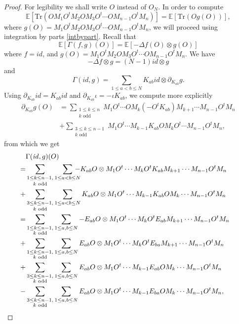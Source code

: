 \documentclass[11pt]{amsart}
\theoremstyle{definition}
\numberwithin{theorem}{section}
\newcommand{\id}{\mathit{id}}
\newcommand{\Tr}{\mathrm{Tr}}
\begin{document}
\begin{proof}
For legibility we shall write $O$ instead of $O_N$. In order
to compute
$$\mathbb{E}\left[\Tr(O M_1 O^t M_2 O M_3 O^t \cdots O M_{n-1}O ^t M_n)\right]=\mathbb{E}\left[\Tr(O g(O))\right],$$
where $g(O)=M_1 O^t M_2 O M_3 O^t \cdots O M_{n-1} O^t M_n$,
we will proceed using integration by parts \eqref{intbypart}. Recall that
\begin{equation*}
\mathbb{E}[\Gamma(f,g)(O)]=\mathbb{E}[-\Delta f(O)\otimes g(O)]
\end{equation*}
where $f=id$, and $g(O)=M_1O^tM_2OM_3O^t\cdots OM_{n-1}O^t M_n$. We have
$$-\Delta f \otimes g=(N-1)id\otimes g$$
and
\[
\Gamma(id,g)=\sum_{1\leq a< b\leq N}K_{ab}id\otimes
\partial_{K_{ab}}g.
\]
Using $\partial_{K_{ab}}id=K_{ab}id$ and
$\partial_{K_{ab}}\iota=-\iota K_{ab}$, we compute more
explicitly
\begin{align*}
\partial_{K_{ab}}g(O)&=\sum_{\substack{1\leq k \leq n\\k\text{ odd}}}M_1O^t\cdots OM_{k}(-O^tK_{ab})M_{k+1}\cdots M_{n-1}O^t M_n\\
&+\sum_{\substack{3\leq k \leq n-1\\k\text{ odd}}}M_1O^t\cdots M_{k-1}K_{ab}OM_{k}O^t\cdots M_{n-1}O^t M_n,
\end{align*}
from which we get
\begin{align*} \lefteqn{
\Gamma(\id,   g)(O) } \\
 = &
\mathop{\sum_{1 \leq k \leq n-1,}}_{k \text{ odd} }
\sum_{1 \leq a < b \leq N} \kern-1em 
-K_{ab}O \otimes M_1O^t \cdots M_{k}O^tK_{ab}M_{k+1} \cdots M_{n-1}O^t M_n \\
+ & 
\mathop{\sum_{3 \leq k \leq n-1,}}_{k \text{ odd} }
\sum_{1\leq a< b\leq N} 
K_{ab}O\otimes M_1O^t\cdots M_{k-1}K_{ab}OM_{k}\cdots M_{n-1}O^t M_n\\
=&\sum_{\substack{1\leq k \leq n-1,\\k\text{ odd}}}\sum_{1\leq a, b\leq N}-E_{ab}O\otimes M_1O^t\cdots M_{k}O^tE_{ab}M_{k+1}\cdots M_{n-1}O^t M_n\\
+&\sum_{\substack{1\leq k \leq n-1,\\k\text{ odd}}}\sum_{1\leq a, b\leq N}E_{ab}O\otimes M_1O^t\cdots M_{k}O^tE_{ba}M_{k+1}\cdots M_{n-1}O^t M_n\\
+&\sum_{\substack{3\leq k \leq n-1,\\k\text{ odd}}}\sum_{1\leq a, b\leq N} E_{ab}O\otimes M_1O^t\cdots M_{k-1}E_{ab}OM_{k}\cdots M_{n-1}O^t M_n\\
-&\sum_{\substack{3\leq k \leq n-1,\\k\text{ odd}}}\sum_{1\leq a, b\leq N} E_{ab}O\otimes M_1O^t\cdots M_{k-1}E_{ba}OM_{k}\cdots M_{n-1}O^t M_n,

\end{align*}
\end{proof}
\end{document}

